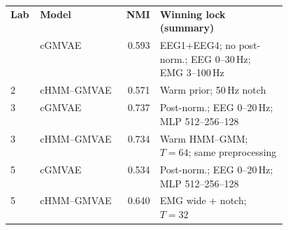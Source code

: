 \small
\setlength{\tabcolsep}{4pt}
\begin{tabular}{|l|l|r|>{\raggedright\arraybackslash}p{0.46\linewidth}|}
\hline
\textbf{Lab} & \textbf{Model} & \textbf{NMI} & \textbf{Winning lock (summary)} \\
\thickhline
2 & cGMVAE & 0.593 & EEG1+EEG4; no post-norm.; EEG 0--30\,Hz; EMG 3--100\,Hz \\
2 & cHMM--GMVAE & 0.571 & Warm prior; 50\,Hz notch \\
\hline
3 & cGMVAE & 0.737 & Post-norm.; EEG 0--20\,Hz; MLP 512--256--128 \\
3 & cHMM--GMVAE & 0.734 & Warm HMM--GMM; $T{=}64$; same preprocessing \\
\hline
5 & cGMVAE & 0.534 & Post-norm.; EEG 0--20\,Hz; MLP 512--256--128 \\
5 & cHMM--GMVAE & 0.640 & EMG wide + notch; $T{=}32$ \\
\hline
\end{tabular}
\normalsize
